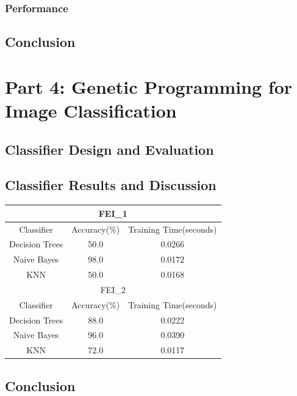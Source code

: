 \documentclass{article}
\begin{document}
\subsubsection*{Performance}
	
\subsection*{Conclusion}

\section*{Part 4: Genetic Programming for Image Classification}
\subsection*{Classifier Design and Evaluation}
\subsection*{Classifier Results and Discussion}
\clearpage
\begin{center}
	\begin{tabular}{|c|c|c|}
		\hline
		\multicolumn{3}{|c|}{FEI\_1} \\
		\hline
		Classifier & Accuracy(\%) & Training Time(seconds) \\
		\hline
		Decision Trees & 50.0 & 0.0266 \\
		\hline
		Naive Bayes & 98.0 & 0.0172 \\
		\hline
		KNN & 50.0 & 0.0168 \\		
		\hline
		\multicolumn{3}{|c|}{FEI\_2} \\
		\hline
		Classifier & Accuracy(\%) & Training Time(seconds) \\
		\hline
		Decision Trees & 88.0 & 0.0222 \\
		\hline
		Naive Bayes & 96.0 & 0.0390 \\
		\hline
		KNN & 72.0 & 0.0117 \\		
		\hline
	\end{tabular}
\end{center}
\subsection*{Conclusion}



\end{document}
